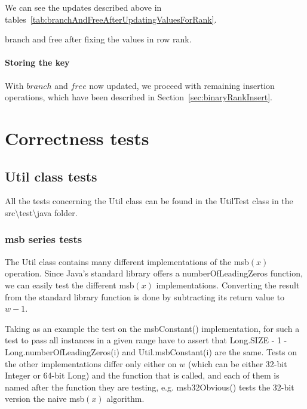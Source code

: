 \begin{enumerate}
    We can see the updates described above in tables~\ref{tab:branchAndFreeAfterUpdatingValuesForRank}.
    \begin{table}[H]
    \centering
    
    \caption{branch and free after fixing the values in row rank.}
    \label{tab:branchAndFreeAfterUpdatingValuesForRank}
    \end{table}
    
\end{enumerate}

\subsubsection{Storing the key} \label{sec:dontCaresInsert}

With $branch$ and $free$ now updated, we proceed with remaining insertion operations, which have been described in Section~\ref{sec:binaryRankInsert}.

\chapter{Correctness tests}

\section{{\ttfamily Util} class tests}

All the tests concerning the {\ttfamily Util} class can be found in the {\ttfamily UtilTest} class in the {\ttfamily src\textbackslash test\textbackslash java} folder.

\subsection{msb series tests}

The {\ttfamily Util} class contains many different implementations of the msb$(x)$ operation. Since Java's standard library offers a {\ttfamily numberOfLeadingZeros} function, we can easily test the different msb$(x)$ implementations. Converting the result from the standard library function is done by subtracting its return value to $w - 1$.

Taking as an example the test on the {\ttfamily msbConstant()} implementation, for such a test to pass all instances in a given range have to assert that {\ttfamily Long.SIZE - 1 - Long.numberOfLeadingZeros(i)} and {\ttfamily Util.msbConstant(i)} are the same. Tests on the other implementations differ only either on $w$ (which can be either 32-bit {\ttfamily Integer} or 64-bit {\ttfamily Long}) and the function that is called, and each of them is named after the function they are testing, e.g. {\ttfamily msb32Obvious()} tests the 32-bit version the naive msb$(x)$ algorithm.

